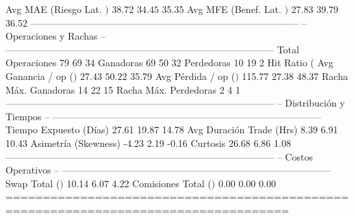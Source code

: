   Avg MAE (Riesgo Lat. $)     $          38.72  $          34.45  $          35.35
  Avg MFE (Benef. Lat. $)     $          27.83  $          39.79  $          36.52
------------------------------------------------------------------------------------
  -- Operaciones y Rachas --
------------------------------------------------------------------------------------
  Total Operaciones                         79                69                34
  Ganadoras                                 69                50                32
  Perdedoras                                10                19                 2
  Hit Ratio (%
  Avg Ganancia / op ($)       $          27.43  $          50.22  $          35.79
  Avg Pérdida / op ($)        $         115.77  $          27.38  $          48.37
  Racha Máx. Ganadoras                      14                22                15
  Racha Máx. Perdedoras                      2                 4                 1
------------------------------------------------------------------------------------
  -- Distribución y Tiempos --
------------------------------------------------------------------------------------
  Tiempo Expuesto (Días)                 27.61             19.87             14.78
  Avg Duración Trade (Hrs)                8.39              6.91             10.43
  Asimetría (Skewness)                   -4.23              2.19             -0.16
  Curtosis                               26.68              6.86              1.08
------------------------------------------------------------------------------------
  -- Costos Operativos --
------------------------------------------------------------------------------------
  Swap Total ($)              $          10.14  $           6.07  $           4.22
  Comisiones Total ($)        $           0.00  $           0.00  $           0.00
====================================================================================

